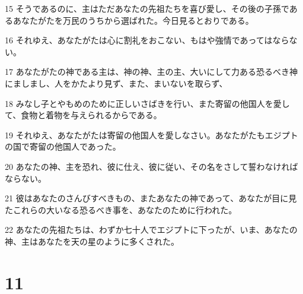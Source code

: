 \par 15 そうであるのに、主はただあなたの先祖たちを喜び愛し、その後の子孫であるあなたがたを万民のうちから選ばれた。今日見るとおりである。
\par 16 それゆえ、あなたがたは心に割礼をおこない、もはや強情であってはならない。
\par 17 あなたがたの神である主は、神の神、主の主、大いにして力ある恐るべき神にましまし、人をかたより見ず、また、まいないを取らず、
\par 18 みなし子とやもめのために正しいさばきを行い、また寄留の他国人を愛して、食物と着物を与えられるからである。
\par 19 それゆえ、あなたがたは寄留の他国人を愛しなさい。あなたがたもエジプトの国で寄留の他国人であった。
\par 20 あなたの神、主を恐れ、彼に仕え、彼に従い、その名をさして誓わなければならない。
\par 21 彼はあなたのさんびすべきもの、またあなたの神であって、あなたが目に見たこれらの大いなる恐るべき事を、あなたのために行われた。
\par 22 あなたの先祖たちは、わずか七十人でエジプトに下ったが、いま、あなたの神、主はあなたを天の星のように多くされた。

\chapter{11}


